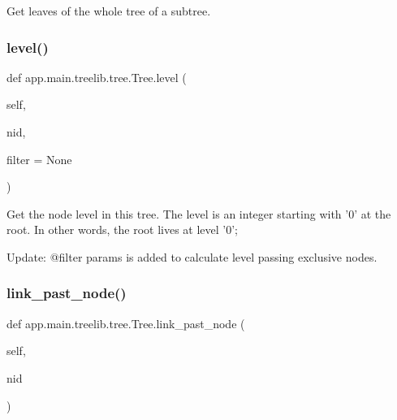 \begin{DoxyVerb}Get leaves of the whole tree of a subtree.\end{DoxyVerb}
 \mbox{\label{classapp_1_1main_1_1treelib_1_1tree_1_1Tree_a3d528173abf063f97e6dfbcf29a0564b}} 
\subsubsection{\texorpdfstring{level()}{level()}}
{\footnotesize\ttfamily def app.\+main.\+treelib.\+tree.\+Tree.\+level (\begin{DoxyParamCaption}\item[{}]{self,  }\item[{}]{nid,  }\item[{}]{filter = {\ttfamily None} }\end{DoxyParamCaption})}

\begin{DoxyVerb}Get the node level in this tree.
The level is an integer starting with '0' at the root.
In other words, the root lives at level '0';

Update: @filter params is added to calculate level passing
exclusive nodes.
\end{DoxyVerb}
 \mbox{\label{classapp_1_1main_1_1treelib_1_1tree_1_1Tree_ae9fd733ebb27ca0f746951d1bb3ccd18}} 
\subsubsection{\texorpdfstring{link\+\_\+past\+\_\+node()}{link\_past\_node()}}
{\footnotesize\ttfamily def app.\+main.\+treelib.\+tree.\+Tree.\+link\+\_\+past\+\_\+node (\begin{DoxyParamCaption}\item[{}]{self,  }\item[{}]{nid }\end{DoxyParamCaption})}

